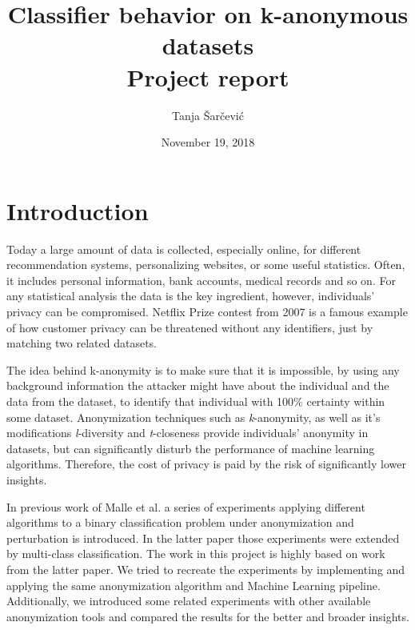 \documentclass{article}
\begin{document}
\author{Tanja Šarčević}
\title{Classifier behavior on k-anonymous datasets \\ 
	 \large Project report}
\date{November 19, 2018}
\maketitle{} 

\section{Introduction}
Today a large amount of data is collected, especially online, for different recommendation systems, personalizing websites, or some useful statistics. Often, it includes personal information, bank accounts, medical records and so on. For any statistical analysis the data is the key ingredient, however, individuals' privacy can be compromised. Netflix Prize contest from 2007 is a famous example of how customer privacy can be threatened without any identifiers, just by matching two related datasets. 

The idea behind k-anonymity is to make sure that it is impossible, by using any background information the attacker might have about the individual and the data from the dataset, to identify that individual with 100\% certainty within some dataset.
Anonymization techniques such as \textit{k}-anonymity, as well as it's modifications \textit{l}-diversity and \textit{t}-closeness provide individuals' anonymity in datasets, but can significantly disturb the performance of machine learning algorithms. Therefore, the cost of privacy is paid by the risk of significantly lower insights. 

In previous work of Malle et al. \cite{malle2016right} a series of experiments applying different algorithms to a binary classification problem under anonymization and perturbation is introduced. In the latter paper \cite{malle2017not} those experiments were extended by multi-class classification. The work in this project is highly based on work from the latter paper. We tried to recreate the experiments by implementing and applying the same anonymization algorithm and Machine Learning pipeline. Additionally, we introduced some related experiments with other available anonymization tools and compared the results for the better and broader insights.
\newpage
\end{document}

